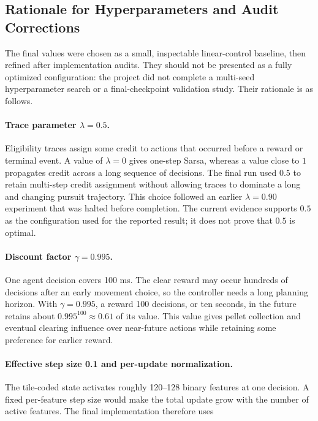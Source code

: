 \documentclass[11pt]{article}
\begin{document}
\subsection{Rationale for Hyperparameters and Audit Corrections}

The final values were chosen as a small, inspectable linear-control baseline,
then refined after implementation audits. They should not be presented as a
fully optimized configuration: the project did not complete a multi-seed
hyperparameter search or a final-checkpoint validation study. Their rationale
is as follows.

\paragraph{Trace parameter $\lambda = 0.5$.}
Eligibility traces assign some credit to actions that occurred before a reward
or terminal event. A value of $\lambda = 0$ gives one-step Sarsa, whereas a
value close to $1$ propagates credit across a long sequence of decisions. The
final run used $0.5$ to retain multi-step credit assignment without allowing
traces to dominate a long and changing pursuit trajectory. This choice followed
an earlier $\lambda = 0.90$ experiment that was halted before completion. The
current evidence supports $0.5$ as the configuration used for the reported
result; it does not prove that $0.5$ is optimal.

\paragraph{Discount factor $\gamma = 0.995$.}
One agent decision covers 100 ms. The clear reward may occur hundreds of
decisions after an early movement choice, so the controller needs a long
planning horizon. With $\gamma = 0.995$, a reward 100 decisions, or ten
seconds, in the future retains about $0.995^{100} \approx 0.61$ of its value.
This value gives pellet collection and eventual clearing influence over
near-future actions while retaining some preference for earlier reward.

\paragraph{Effective step size 0.1 and per-update normalization.}
The tile-coded state activates roughly 120--128 binary features at one
decision. A fixed per-feature step size would make the total update grow with
the number of active features. The final implementation therefore uses
\end{document}
